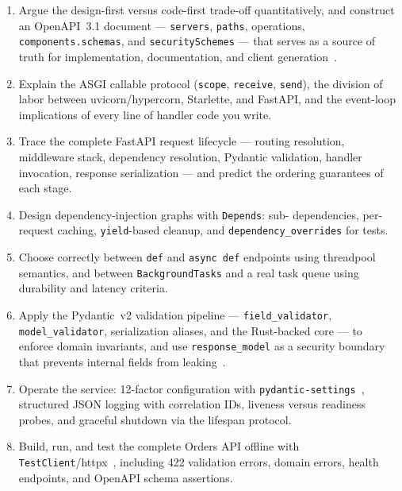 \begin{enumerate}[label=\textbf{LO-\arabic*.}, leftmargin=2.6cm]
  \item Argue the design-first versus code-first trade-off quantitatively, and
        construct an OpenAPI~3.1 document --- \texttt{servers},
        \texttt{paths}, operations, \texttt{components.schemas}, and
        \texttt{securitySchemes} --- that serves as a source of truth for
        implementation, documentation, and client
        generation~\cite{openapi31}.
  \item Explain the ASGI callable protocol (\texttt{scope},
        \texttt{receive}, \texttt{send}), the division of labor between
        uvicorn/hypercorn, Starlette, and FastAPI, and the event-loop
        implications of every line of handler code you write.
  \item Trace the complete FastAPI request lifecycle --- routing resolution,
        middleware stack, dependency resolution, Pydantic validation, handler
        invocation, response serialization --- and predict the ordering
        guarantees of each stage.
  \item Design dependency-injection graphs with \texttt{Depends}: sub-
        dependencies, per-request caching, \texttt{yield}-based cleanup, and
        \texttt{dependency\_overrides} for tests.
  \item Choose correctly between \texttt{def} and \texttt{async~def}
        endpoints using threadpool semantics, and between
        \texttt{BackgroundTasks} and a real task queue using durability and
        latency criteria.
  \item Apply the Pydantic~v2 validation pipeline ---
        \texttt{field\_validator}, \texttt{model\_validator}, serialization
        aliases, and the Rust-backed core --- to enforce domain invariants,
        and use \texttt{response\_model} as a security boundary that prevents
        internal fields from leaking~\cite{pydanticdocs}.
  \item Operate the service: 12-factor configuration with
        \texttt{pydantic-settings}~\cite{twelvefactor}, structured JSON
        logging with correlation IDs, liveness versus readiness probes, and
        graceful shutdown via the lifespan protocol.
  \item Build, run, and test the complete Orders API offline with
        \texttt{TestClient}/httpx~\cite{httpxdocs}, including 422 validation
        errors, domain errors, health endpoints, and OpenAPI schema
        assertions.
\end{enumerate}

